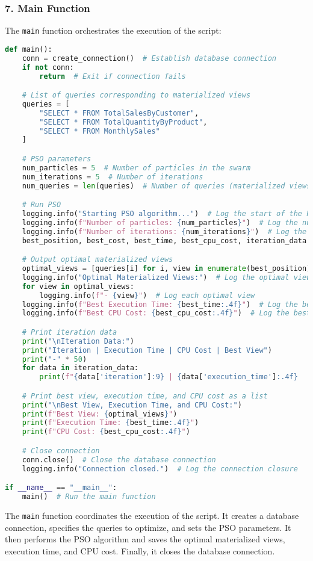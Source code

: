 \subsubsection*{7. Main Function}
The \texttt{main} function orchestrates the execution of the script:
\begin{lstlisting}[language=Python]
def main():
    conn = create_connection()  # Establish database connection
    if not conn:
        return  # Exit if connection fails

    # List of queries corresponding to materialized views
    queries = [
        "SELECT * FROM TotalSalesByCustomer",
        "SELECT * FROM TotalQuantityByProduct",
        "SELECT * FROM MonthlySales"
    ]

    # PSO parameters
    num_particles = 5  # Number of particles in the swarm
    num_iterations = 5  # Number of iterations
    num_queries = len(queries)  # Number of queries (materialized views) to optimize

    # Run PSO
    logging.info("Starting PSO algorithm...")  # Log the start of the PSO algorithm
    logging.info(f"Number of particles: {num_particles}")  # Log the number of particles
    logging.info(f"Number of iterations: {num_iterations}")  # Log the number of iterations
    best_position, best_cost, best_time, best_cpu_cost, iteration_data = pso(num_particles, num_iterations, num_queries, queries, conn)

    # Output optimal materialized views
    optimal_views = [queries[i] for i, view in enumerate(best_position) if view == 1]  # Get optimal views
    logging.info("Optimal Materialized Views:")  # Log the optimal views
    for view in optimal_views:
        logging.info(f"- {view}")  # Log each optimal view
    logging.info(f"Best Execution Time: {best_time:.4f}")  # Log the best execution time
    logging.info(f"Best CPU Cost: {best_cpu_cost:.4f}")  # Log the best CPU cost

    # Print iteration data
    print("\nIteration Data:")
    print("Iteration | Execution Time | CPU Cost | Best View")
    print("-" * 50)
    for data in iteration_data:
        print(f"{data['iteration']:9} | {data['execution_time']:.4f}       | {data['cpu_cost']:.4f}   | {', '.join(data['best_view'])}")

    # Print best view, execution time, and CPU cost as a list
    print("\nBest View, Execution Time, and CPU Cost:")
    print(f"Best View: {optimal_views}")
    print(f"Execution Time: {best_time:.4f}")
    print(f"CPU Cost: {best_cpu_cost:.4f}")

    # Close connection
    conn.close()  # Close the database connection
    logging.info("Connection closed.")  # Log the connection closure

if __name__ == "__main__":
    main()  # Run the main function
\end{lstlisting}\vspace{.4cm}

The \texttt{main} function coordinates the execution of the script. It creates a database connection, specifies the queries to optimize, and sets the PSO parameters. It then performs the PSO algorithm and saves the optimal materialized views, execution time, and CPU cost. Finally, it closes the database connection.

